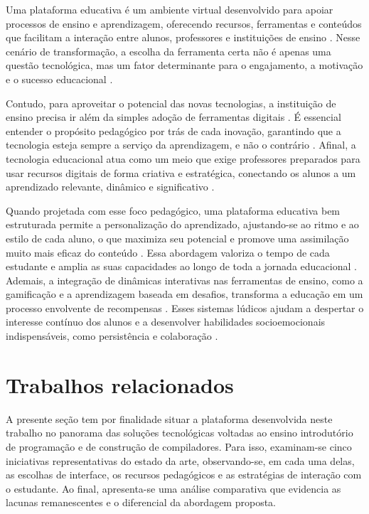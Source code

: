 Uma plataforma educativa é um ambiente virtual desenvolvido para apoiar processos de ensino e aprendizagem, oferecendo recursos, ferramentas e conteúdos que facilitam a interação entre alunos, professores e instituições de ensino . Nesse cenário de transformação, a escolha da ferramenta certa não é apenas uma questão tecnológica, mas um fator determinante para o engajamento, a motivação e o sucesso educacional .

Contudo, para aproveitar o potencial das novas tecnologias, a instituição de ensino precisa ir além da simples adoção de ferramentas digitais . É essencial entender o propósito pedagógico por trás de cada inovação, garantindo que a tecnologia esteja sempre a serviço da aprendizagem, e não o contrário . Afinal, a tecnologia educacional atua como um meio que exige professores preparados para usar recursos digitais de forma criativa e estratégica, conectando os alunos a um aprendizado relevante, dinâmico e significativo .

Quando projetada com esse foco pedagógico, uma plataforma educativa bem estruturada permite a personalização do aprendizado, ajustando-se ao ritmo e ao estilo de cada aluno, o que maximiza seu potencial e promove uma assimilação muito mais eficaz do conteúdo . Essa abordagem valoriza o tempo de cada estudante e amplia as suas capacidades ao longo de toda a jornada educacional . Ademais, a integração de dinâmicas interativas nas ferramentas de ensino, como a gamificação e a aprendizagem baseada em desafios, transforma a educação em um processo envolvente de recompensas . Esses sistemas lúdicos ajudam a despertar o interesse contínuo dos alunos e a desenvolver habilidades socioemocionais indispensáveis, como persistência e colaboração .

\label{sec:softwares-apoio}







\section{Trabalhos relacionados}
\label{sec:trabalhos-relacionados}

A presente seção tem por finalidade situar a plataforma desenvolvida neste trabalho no panorama das soluções tecnológicas voltadas ao ensino introdutório de programação e de construção de compiladores. Para isso, examinam-se cinco iniciativas representativas do estado da arte, observando-se, em cada uma delas, as escolhas de interface, os recursos pedagógicos e as estratégias de interação com o estudante. Ao final, apresenta-se uma análise comparativa que evidencia as lacunas remanescentes e o diferencial da abordagem proposta.

